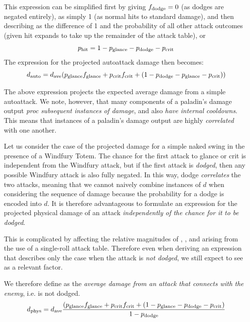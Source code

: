 \documentclass[letterpaper,11pt]{article}
\begin{document}
	This expression can be simplified first by giving $f_{\mathrm{dodge}}  = 0$ (as dodges are negated entirely), \fhit as simply 1 (as normal hits to standard damage), and then describing \phit as the difference of 1 and the probability of all other attack outcomes (given hit expands to take up the remainder of the attack table), or
	\begin{equation}
		p_{\mathrm{hit}}  = 1 - p_{\mathrm{glance}}  - p_{\mathrm{dodge}}  - p_{\mathrm{crit}} 
	\end{equation}
	The expression for the projected autoattack damage then becomes:
	\begin{equation}
		d_{\mathrm{auto}}  = d_{\mathrm{ave}}  (p_{\mathrm{glance}}  f_{\mathrm{glance}}  + p_{\mathrm{crit}}  f_{\mathrm{crit}}  + (1 - p_{\mathrm{dodge}}  - p_{\mathrm{glance}}  - p_{\mathrm{crit}} ))
	\end{equation}
	
	The above expression projects the expected average damage from a simple autoattack.
	We note, however, that many components of a paladin's damage output \emph{proc subsequent instances of damage}, and also \emph{have internal cooldowns}.
	This means that instances of a paladin's damage output are highly \emph{correlated} with one another.
	
	Let us consider the case of the projected damage for a simple naked swing in the presence of a Windfury Totem.
	The chance for the first attack to glance or crit is independent from the Windfury attack, but if the first attack is \emph{dodged}, then any possible Windfury attack is also fully negated.
	In this way, dodge \emph{correlates} the two attacks, meaning that we cannot naively combine instances of $d$ when considering the sequence of damage because the probability for a dodge is encoded into $d$.
	It is therefore advantageous to formulate an expression for the projected physical damage of an attack \emph{independently of the chance for it to be dodged}.
	
	This is complicated by \pdodge affecting the relative magnitudes of \phit, \pglance, and \pcrit arising from the use of a single-roll attack table.
	Therefore even when deriving an expression that describes only the case when the attack is \emph{not dodged}, we still expect to see \pdodge as a relevant factor.
	
	We therefore define \dphys as the \emph{average damage from an attack that connects with the enemy}, i.e. is not dodged.
	\begin{equation}
		d_{\mathrm{phys}}  = d_{\mathrm{ave}}  \frac{(p_{\mathrm{glance}}  f_{\mathrm{glance}}  + p_{\mathrm{crit}}  f_{\mathrm{crit}}  + (1 - p_{\mathrm{glance}}  - p_{\mathrm{dodge}}  - p_{\mathrm{crit}} )}{1 - p_{\mathrm{dodge}} }
	\end{equation}
	
\end{document}
